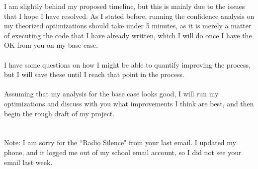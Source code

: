 \documentclass[letterpaper,10pt]{article}
\begin{document}
I am slightly behind my proposed timeline, but this is mainly due to the issues that I hope I have resolved. As I stated before, running the confidence analysis on my theorized optimizations should take under 5 minutes, as it is merely a matter of executing the code that I have already written, which I will do once I have the OK from you on my base case.\\\\
I have some questions on how I might be able to quantify improving the process, but I will save these until I reach that point in the process.\\\\
Assuming that my analysis for the base case looks good, I will run my optimizations and discuss with you what improvements I think are best, and then begin the rough draft of my project.\\\\\\
Note: I am sorry for the ``Radio Silence" from your last email. I updated my phone, and it logged me out of my school email account, so I did not see your email last week.
\end{document}
